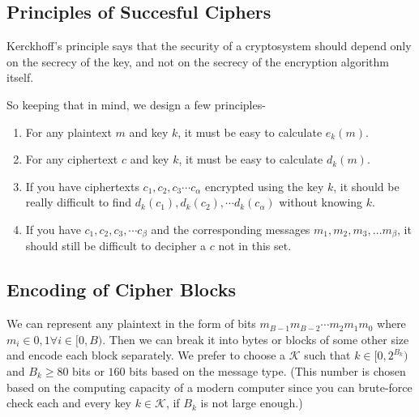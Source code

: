 		\subsection{Principles of Succesful Ciphers}
			\begin{mybox}
				Kerckhoff’s principle says that the security of a cryptosystem should depend only on the secrecy of the key, and not on the secrecy of the encryption algorithm itself. 
			\end{mybox}
			So keeping that in mind, we design a few principles-
			\begin{enumerate}
				\item For any plaintext \(m\) and key \(k\), it must be easy to calculate \(e_k(m)\).
				\item For any ciphertext \(c\) and key \(k\), it must be easy to calculate \(d_k(m)\).
				\item If you have ciphertexts \(c_1, c_2, c_3\cdots c_\alpha\) encrypted using the key \(k\), it should be really difficult to find \(d_k(c_1), d_k(c_2), \cdots d_k(c_\alpha)\) without knowing \(k\).
				\item If you have \(c_1, c_2, c_3, \cdots c_\beta\) and the corresponding messages \(m_1, m_2, m_3, \ldots m_\beta \), it should still be difficult to decipher a \(c\) not in this set.
			\end{enumerate}

		\subsection{Encoding of Cipher Blocks}
			We can represent any plaintext in the form of bits \(m_{B-1}m_{B-2}\cdots m_2m_1m_0\) where \(m_i \in {0,1} \forall i\in [0,B)\). Then we can break it into bytes or blocks of some other size and encode each block separately. We prefer to choose a \(\mathcal{K}\) such that \(k \in [0, 2^{B_k})\) and \(B_k \geq 80\) bits or \(160\) bits based on the message type. (This number is chosen based on the computing capacity of a modern computer since you can brute-force check each and every key \(k \in \mathcal{K}\), if \(B_k\) is not large enough.) 

